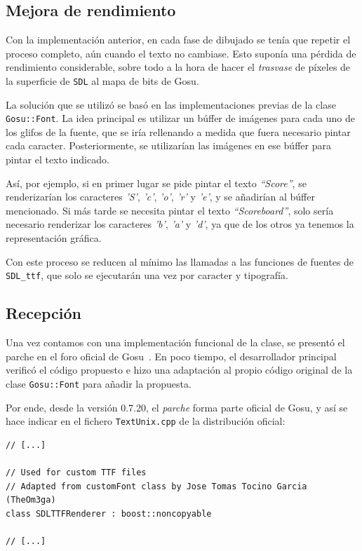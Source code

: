 \subsection{Mejora de rendimiento}
Con la implementación anterior, en cada fase de dibujado se tenía que repetir el
proceso completo, aún cuando el texto no cambiase. Esto suponía una pérdida de
rendimiento considerable, sobre todo a la hora de hacer el \textit{trasvase} de
píxeles de la superficie de \texttt{SDL} al mapa de bits de Gosu.

La solución que se utilizó se basó en las implementaciones previas de la clase
\texttt{Gosu::Font}. La idea principal es utilizar un búffer de imágenes para
cada uno de los glifos de la fuente, que se iría rellenando a medida que fuera
necesario pintar cada caracter. Posteriormente, se utilizarían las imágenes en
ese búffer para pintar el texto indicado.

Así, por ejemplo, si en primer lugar se pide pintar el texto \textit{``Score''},
se renderizarían los caracteres \textit{'S'}, \textit{'c'}, \textit{'o'},
\textit{'r'} y \textit{'e'}, y se añadirían al búffer mencionado. Si más tarde
se necesita pintar el texto \textit{``Scoreboard''}, solo sería necesario
renderizar los caracteres \textit{'b'}, \textit{'a'} y \textit{'d'}, ya que de
los otros ya tenemos la representación gráfica.

Con este proceso se reducen al mínimo las llamadas a las funciones de fuentes de
\texttt{SDL\_ttf}, que solo se ejecutarán una vez por caracter y tipografía.

\subsection{Recepción}

Una vez contamos con una implementación funcional de la clase, se presentó el
parche en el foro oficial de Gosu~\cite{foroGosu}. En poco tiempo, el
desarrollador principal verificó el código propuesto e hizo una adaptación al
propio código original de la clase \texttt{Gosu::Font} para añadir la
propuesta. 

Por ende, desde la versión 0.7.20, el \textit{parche} forma parte
oficial de Gosu, y así se hace indicar en el fichero \texttt{TextUnix.cpp} de la
distribución oficial:

\begin{verbatim}
// [...]

// Used for custom TTF files
// Adapted from customFont class by Jose Tomas Tocino Garcia (TheOm3ga)
class SDLTTFRenderer : boost::noncopyable

// [...]
\end{verbatim}

